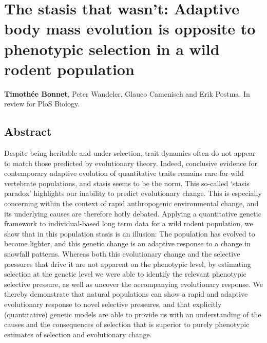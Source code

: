 

\chapter[\texorpdfstring{Chapter 4 \\ The stasis that wasn't: Adaptive body mass evolution is opposite to phenotypic selection in a wild rodent population}{Chapter 4 -- The stasis that wasn't: Adaptive body mass evolution is opposite to phenotypic selection in a wild rodent population}]{The stasis that wasn't: Adaptive body mass evolution is opposite to phenotypic selection in a wild rodent population}
\label{chap:stasis}

\textbf{Timoth\'{e}e Bonnet}, Peter Wandeler, Glauco Camenisch and Erik Postma. In review for PloS Biology. 

\section{Abstract}
Despite being heritable and under selection, trait dynamics often do not appear to match those predicted by evolutionary theory. Indeed, conclusive evidence for contemporary adaptive evolution of quantitative traits remains rare for wild vertebrate populations, and stasis seems to be the norm. 
This so-called `stasis paradox' highlights our inability to predict evolutionary change. This is especially concerning within the context of rapid anthropogenic environmental change, and its underlying causes are therefore hotly debated.
Applying a quantitative genetic framework to individual-based long term data for a wild rodent population, we show that in this population stasis is an illusion: The population has evolved to become lighter, and this genetic change is an adaptive response to a change in snowfall patterns. Whereas both this evolutionary change and the selective pressures that drive it are not apparent on the phenotypic level, by estimating selection at the genetic level we were able to identify the relevant phenotypic selective pressure, as well as uncover the accompanying evolutionary response.
We thereby demonstrate that natural populations can show a rapid and adaptive evolutionary response to novel selective pressures, and that explicitly (quantitative) genetic models are able to provide us with an understanding of the causes and the consequences of selection that is superior to purely phenotypic estimates of selection and evolutionary change.


